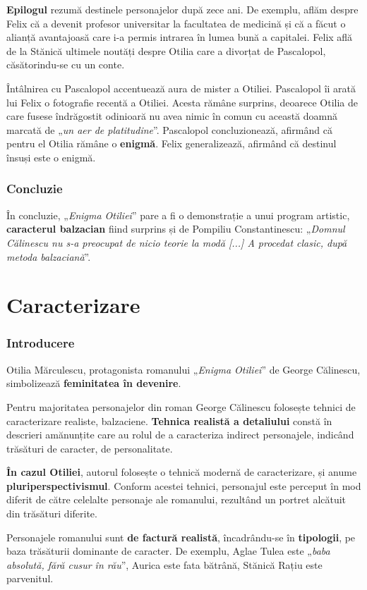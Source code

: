 \documentclass{article}
\newcommand{\qu}[1]{„\emph{#1}”}
\begin{document}
\textbf{Epilogul} rezumă destinele personajelor după zece ani. De exemplu, aflăm despre Felix că a devenit profesor universitar la facultatea de medicină și că a făcut o alianță avantajoasă care i-a permis intrarea în lumea bună a capitalei. Felix află de la Stănică ultimele noutăți despre Otilia care a divorțat de Pascalopol, căsătorindu-se cu un conte.

Întâlnirea cu Pascalopol accentuează aura de mister a Otiliei. Pascalopol îi arată lui Felix o fotografie recentă a Otiliei. Acesta rămâne surprins, deoarece Otilia de care fusese îndrăgostit odinioară nu avea nimic în comun cu această doamnă marcată de \qu{un aer de platitudine}. Pascalopol concluzionează, afirmând că pentru el Otilia rămâne o \textbf{enigmă}. Felix generalizează, afirmând că destinul însuși este o enigmă.
\section{Concluzie}
În concluzie, \qu{Enigma Otiliei} pare a fi o demonstrație a unui program artistic, \textbf{caracterul balzacian} fiind surprins și de Pompiliu Constantinescu: \qu{Domnul Călinescu nu s-a preocupat de nicio teorie la modă [...] A procedat clasic, după metoda balzaciană}.
\part*{Caracterizare}
\setcounter{section}{0}
\section{Introducere}
Otilia Mărculescu, protagonista romanului \qu{Enigma Otiliei} de George Călinescu, simbolizează \textbf{feminitatea în devenire}.

Pentru majoritatea personajelor din roman George Călinescu folosește tehnici de caracterizare realiste, balzaciene. \textbf{Tehnica realistă a detaliului} constă în descrieri amănunțite care au rolul de a caracteriza indirect personajele, indicând trăsături de caracter, de personalitate.

\textbf{În cazul Otiliei}, autorul folosește o tehnică modernă de caracterizare, și anume \textbf{pluriperspectivismul}. Conform acestei tehnici, personajul este perceput în mod diferit de către celelalte personaje ale romanului, rezultând un portret alcătuit din trăsături diferite.

Personajele romanului sunt \textbf{de factură realistă}, încadrându-se în \textbf{tipologii}, pe baza trăsăturii dominante de caracter. De exemplu, Aglae Tulea este \qu{baba absolută, fără cusur în rău}, Aurica este fata bătrână, Stănică Rațiu este parvenitul.
\end{document}

